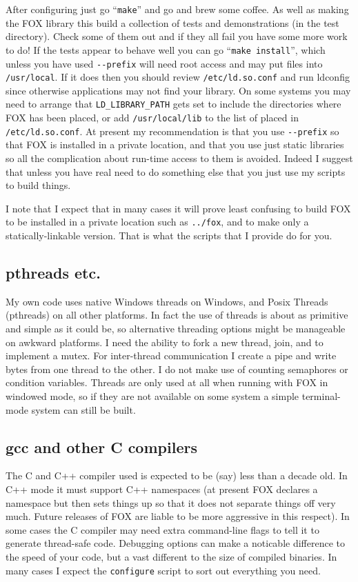 \documentclass[11pt]{article}
\begin{document}
After configuring just go ``\verb+make+'' and go and brew some coffee. 
As well as making the FOX library this build a collection of tests and
demonstrations (in the test directory). Check some of them out and if
they all fail you have some more work to do! If the tests appear to behave
well you can go ``\verb+make install+'', which unless you have used
\verb+--prefix+ will need root access and may put files
into \verb+/usr/local+. If it does then you should review
\verb+/etc/ld.so.conf+ and run ldconfig since otherwise applications may
not find your library. On some systems you may need to arrange that
\verb+LD_LIBRARY_PATH+ gets set to include the directories where FOX has
been placed, or add \verb+/usr/local/lib+ to the list of placed in
\verb+/etc/ld.so.conf+. At present my recommendation is that you use
\verb+--prefix+ so that FOX is installed in a private location, and that you
use just static libraries so all the complication about run-time access to
them is avoided. Indeed I suggest that unless you have real need to do
something else that you just use my scripts to build things.

I note that I expect that in many cases it will prove least confusing to build
FOX to be installed in a private location such as \verb+../fox+, and to
make only a statically-linkable version. That is what the scripts that I
provide do for you.

\subsection{pthreads etc.}
My own code uses native Windows threads on Windows, and Posix Threads
(pthreads) on all other platforms. In fact the use of threads is about
as primitive and simple as it could be, so alternative threading options
might be manageable on awkward platforms. I need the ability to fork
a new thread, join, and to implement a mutex. For inter-thread
communication I create a pipe and write bytes from one thread to
the other. I do not make use of counting semaphores or condition variables.
Threads are only used at all when running with FOX in windowed mode, so if
they are not available on some system a simple terminal-mode system can
still be built. 

\subsection{gcc and other C compilers}
The C and C++ compiler used is expected to be (say) less than a decade
old. In C++ mode it must support C++ namespaces (at present FOX declares
a namespace but then sets things up so that it does not separate things off
very much. Future releases of FOX are liable to be more aggressive in this
respect). In some cases the C compiler may need extra command-line flags
to tell it to generate thread-safe code. Debugging options can make a
noticable difference to the speed of your code, but a vast different to the
size of compiled binaries. In many cases I expect the \verb+configure+ script
to sort out everything you need.
\end{document}
